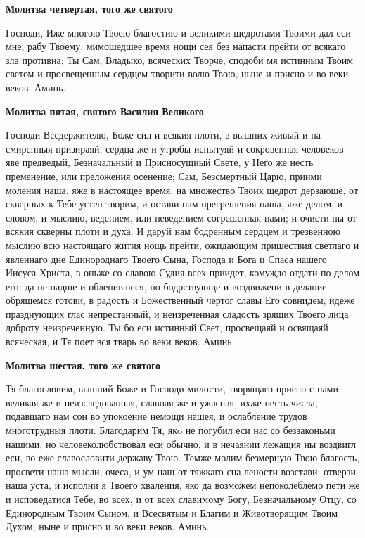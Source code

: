  

\bfseries Молитва четвертая, того же святого\normalfont{}


   Господи, Иже многою Твоею благостию и великими щедротами Твоими
дал еси мне, рабу Твоему, мимошедшее время нощи сея без напасти прейти
от всякаго зла противна; Ты Сам, Владыко, всяческих Творче, сподоби мя
истинным Твоим светом и просвещенным сердцем творити волю Твою, ныне
и присно и во веки веков. Аминь.



 

\bfseries Молитва пятая, святого Василия Великого\normalfont{}


   Господи Вседержителю, Боже сил и всякия плоти, в вышних живый и на
смиренныя призираяй, сердца же и утробы испытуяй и сокровенная
человеков яве предведый, Безначальный и Присносущный Свете, у Него же
несть пременение, или преложения осенение; Сам, Безсмертный Царю,
приими моления наша, яже в настоящее время, на множество Твоих щедрот
дерзающе, от скверных к Тебе устен творим, и остави нам прегрешения
наша, яже делом, и словом, и мыслию, ведением, или неведением
согрешенная нами; и очисти ны от всякия скверны плоти и духа. И даруй
нам бодренным сердцем и трезвенною мыслию всю настоящаго жития нощь
прейти, ожидающим пришествия светлаго и явленнаго дне Единороднаго
Твоего Сына, Господа и Бога и Спаса нашего Иисуса Христа, в оньже
со славою Судия всех приидет, комуждо отдати по делом его; да
не падше и обленившеся, но бодрствующе и воздвижени в делание
обрящемся готови, в радость и Божественный чертог славы Его совнидем,
идеже празднующих глас непрестанный, и неизреченная сладость
зрящих Твоего лица доброту неизреченную. Ты бо еси истинный Свет,
просвещаяй и освящаяй всяческая, и Тя поет вся тварь во веки веков.
Аминь.



 

\bfseries Молитва шестая, того же святого\normalfont{}


   Тя благословим, вышний Боже и Господи милости, творящаго
присно с нами великая же и неизследованная, славная же и ужасная,
ихже несть числа, подавшаго нам сон во упокоение немощи нашея,
и ослабление трудов многотрудныя плоти. Благодарим Тя, якo не
погубил еси нас со беззаконьми нашими, но человеколюбствовал еси
обычно, и в нечаянии лежащия ны воздвигл еси, во еже славословити
державу Твою. Темже молим безмерную Твою благость, просвети наша
мысли, очеса, и ум наш от тяжкаго сна лености возстави: отверзи наша
уста, и исполни я Твоего хваления, яко да возможем непоколеблемо
пети же и исповедатися Тебе, во всех, и от всех славимому Богу,
Безначальному Отцу, со Единородным Твоим Сыном, и Всесвятым и
Благим и Животворящим Твоим Духом, ныне и присно и во веки веков.
Аминь.



